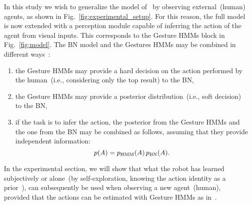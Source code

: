 In this study we wish to generalize the model of~\cite{salvi:2012:smcb} by observing external~(human) agents, as shown in Fig.~\ref{fig:experimental_setup}. For this reason, the full model is now extended with a perception module capable of inferring the action of the agent from visual inputs. This corresponds to the Gesture \acp{HMM} block in Fig.~\ref{fig:model}. The \AffWords{} \acf{BN} model and the Gestures \acp{HMM} may be combined in different ways~\cite{pan:2006:ictai}:
\begin{enumerate}
\item the Gesture \acp{HMM} may provide a hard decision on the action performed by the human~(i.e., considering only the top result) to the \ac{BN},

\item the Gesture \acp{HMM} may provide a posterior distribution~(i.e., soft decision) to the \ac{BN},

\item if the task is to infer the action, the posterior from the Gesture \acp{HMM} and the one from the \ac{BN} may be combined as follows, assuming that they provide independent information:
\begin{equation*}
p(A) = p_{\text{HMM}}(A) \, p_{\text{BN}}(A).
\end{equation*}
\end{enumerate}

In the experimental section, we will show that what the robot has learned subjectively or alone~(by self-exploration, knowing the action identity as a prior~\cite{salvi:2012:smcb}), can subsequently be used when observing a new agent~(human), provided that the actions can be estimated with Gesture \acp{HMM} as in~\cite{saponaro:2013:crhri}.

